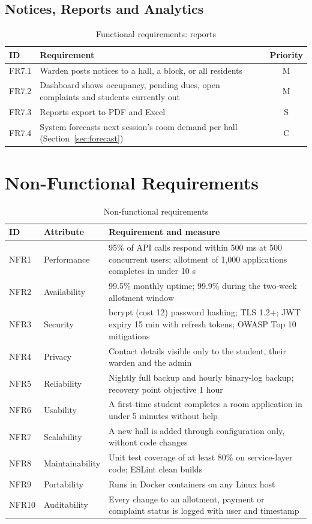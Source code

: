 \documentclass[11pt,a4paper]{report}
\begin{document}
\subsection{Notices, Reports and Analytics}
\begin{table}[H]
\centering\small
\caption{Functional requirements: reports}\label{tab:fr-rep}
\begin{tabularx}{\textwidth}{lLc}
\toprule
\textbf{ID} & \textbf{Requirement} & \textbf{Priority}\\
\midrule
FR7.1 & Warden posts notices to a hall, a block, or all residents & M\\
FR7.2 & Dashboard shows occupancy, pending dues, open complaints and students currently out & M\\
FR7.3 & Reports export to PDF and Excel & S\\
FR7.4 & System forecasts next session's room demand per hall (Section~\ref{sec:forecast}) & C\\
\bottomrule
\end{tabularx}
\end{table}

\section{Non-Functional Requirements}
\begin{table}[H]
\centering\small
\caption{Non-functional requirements}\label{tab:nfr}
\begin{tabularx}{\textwidth}{llL}
\toprule
\textbf{ID} & \textbf{Attribute} & \textbf{Requirement and measure}\\
\midrule
NFR1 & Performance & 95\% of API calls respond within 500 ms at 500 concurrent users; allotment of 1,000 applications completes in under 10 s\\
NFR2 & Availability & 99.5\% monthly uptime; 99.9\% during the two-week allotment window\\
NFR3 & Security & bcrypt (cost 12) password hashing; TLS 1.2+; JWT expiry 15 min with refresh tokens; OWASP Top 10 mitigations\\
NFR4 & Privacy & Contact details visible only to the student, their warden and the admin\\
NFR5 & Reliability & Nightly full backup and hourly binary-log backup; recovery point objective 1 hour\\
NFR6 & Usability & A first-time student completes a room application in under 5 minutes without help\\
NFR7 & Scalability & A new hall is added through configuration only, without code changes\\
NFR8 & Maintainability & Unit test coverage of at least 80\% on service-layer code; ESLint clean builds\\
NFR9 & Portability & Runs in Docker containers on any Linux host\\
NFR10 & Auditability & Every change to an allotment, payment or complaint status is logged with user and timestamp\\
\bottomrule
\end{tabularx}
\end{table}
\end{document}
